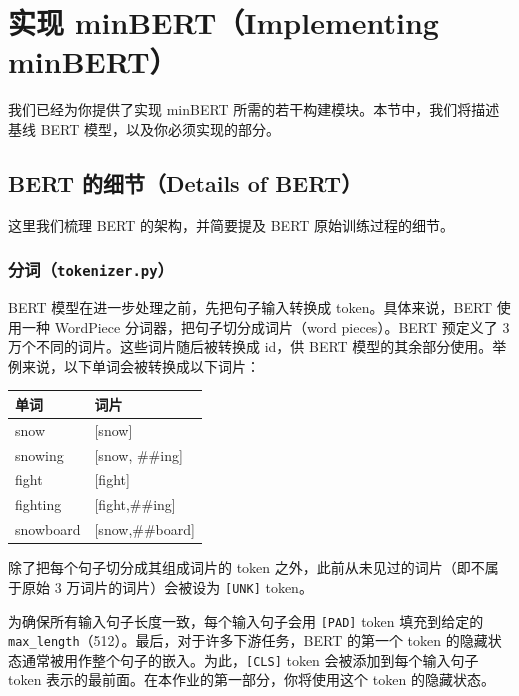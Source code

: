 \documentclass[11pt]{article}
\begin{document}
\section{实现 minBERT（Implementing minBERT）}

我们已经为你提供了实现 minBERT 所需的若干构建模块。本节中，我们将描述基线 BERT 模型，以及你必须实现的部分。

\subsection{BERT 的细节（Details of BERT）}

这里我们梳理 BERT 的架构，并简要提及 BERT 原始训练过程的细节。

\subsubsection{分词（\texttt{tokenizer.py}）}

BERT 模型在进一步处理之前，先把句子输入转换成 token。具体来说，BERT 使用一种 WordPiece 分词器，把句子切分成词片（word pieces）。BERT 预定义了 3 万个不同的词片。这些词片随后被转换成 id，供 BERT 模型的其余部分使用。举例来说，以下单词会被转换成以下词片：

\begin{center}
\begin{tabular}{ll}
  \toprule
  \textbf{单词} & \textbf{词片} \\
  \midrule
  snow        & [snow] \\
  snowing     & [snow, \#\#ing] \\
  fight       & [fight] \\
  fighting    & [fight,\#\#ing] \\
  snowboard   & [snow,\#\#board] \\
  \bottomrule
\end{tabular}
\end{center}

除了把每个句子切分成其组成词片的 token 之外，此前从未见过的词片（即不属于原始 3 万词片的词片）会被设为 \texttt{[UNK]} token。

为确保所有输入句子长度一致，每个输入句子会用 \texttt{[PAD]} token 填充到给定的 \texttt{max\_length}（512）。最后，对于许多下游任务，BERT 的第一个 token 的隐藏状态通常被用作整个句子的嵌入。为此，\texttt{[CLS]} token 会被添加到每个输入句子 token 表示的最前面。在本作业的第一部分，你将使用这个 token 的隐藏状态。
\end{document}

